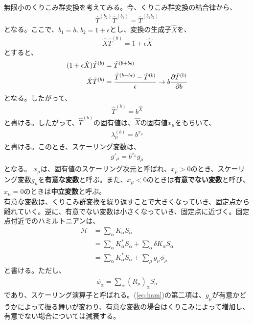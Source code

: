 \documentclass[a4paper,11pt]{jsarticle}
\numberwithin{equation}{section}
\begin{document}
無限小のくりこみ群変換を考えてみる。今、くりこみ群変換の結合律から、
\begin{align}
    \hat{T}^{(b_2)} \hat{T}^{(b_1)} = \hat{T}^{(b_1b_2)}
\end{align}
となる。ここで、$b_1 = b$, $b_2 = 1 + \epsilon$とし、変換の生成子$\hat{X}$を、
\begin{align}
    \hat{X} \hat{T}^{(b)} = 1 + \epsilon \hat{X} 
\end{align}
とすると、
\begin{align}
    (1 + \epsilon \hat{X}) \hat{T}^{(b)} &= \hat{T}^{(b+ b\epsilon)}\\
    \hat{X} \hat{T}^{(b)} &=  \frac{\hat{T}^{(b+ b\epsilon)} - \hat{T}^{(b)}}{\epsilon} \to b \pdv{\hat{T}^{(b)}}{b}
\end{align}
となる。したがって、
\begin{align}
    \hat{T}^{(b)} = b^{\hat{X}} 
\end{align}
と書ける。したがって、$\hat{T}^{(b)}$の固有値は、$\hat{X}$の固有値$x_{\mu}$をもちいて、
\begin{align}
    \lambda_{\mu}^{(b)} = b^{x_{\mu}}
\end{align}
と書ける。このとき、スケーリング変数は、
\begin{align}
    g'_{\mu} = b^{x_{\mu}} g_{\mu}
\end{align}
となる。
$x_{\mu}$は、固有値のスケーリング次元と呼ばれ、$x_{\mu} > 0$のとき、スケーリング変数$g_{\mu}$を\textbf{有意な変数}と呼ぶ。また、$x_{\mu} < 0$のときは\textbf{有意でない変数}と呼び、$x_{\mu} = 0$のときは\textbf{中立変数}と呼ぶ。\\
有意な変数は、くりこみ群変換を繰り返すことで大きくなっていき、固定点から離れていく。逆に、有意でない変数は小さくなっていき、固定点に近づく。固定点付近でのハミルトニアンは、
\begin{align}
    \mathcal{H} &= \sum_{\alpha} K_{\alpha} S_{\alpha}\\
    &= \sum_{\alpha} K_{\alpha}^* S_{\alpha} + \sum_{\alpha} \delta K_{\alpha} S_{\alpha}\\
    &= \sum_{\alpha} K_{\alpha}^* S_{\alpha} + \sum_{\mu} g_{\mu} \phi_{\mu} \label{eq:ham}
\end{align}
と書ける。ただし、
\begin{align}
    \phi_{\alpha} = \sum_{\alpha} (R_{\mu})_{\alpha} S_{\alpha}
\end{align}
であり、スケーリング演算子と呼ばれる。(\ref{eq:ham})の第二項は、$g_{\mu}$が有意かどうかによって振る舞いが変わり、有意な変数の場合はくりこみによって増加し、有意でない場合については減衰する。\\
\end{document}

